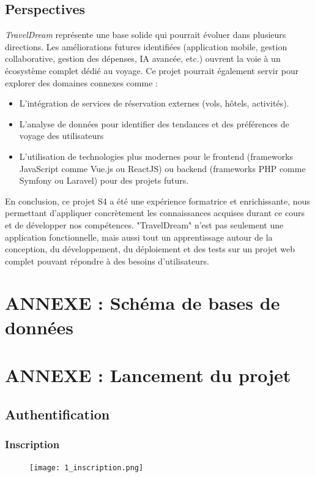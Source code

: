 \documentclass[a4paper,12pt]{article}
\begin{document}
\subsection{Perspectives}
\textit{TravelDream}  représente une base solide qui pourrait évoluer dans plusieurs directions. Les améliorations futures identifiées (application mobile, gestion collaborative, gestion des dépenses, IA avancée, etc.) ouvrent la voie à un écosystème complet dédié au voyage.
Ce projet pourrait également servir pour explorer des domaines connexes
comme :
\begin{itemize}
    \item L'intégration de services de réservation externes (vols, hôtels, activités).
    \item L'analyse de données pour identifier des tendances et des préférences de voyage des utilisateurs
    \item L'utilisation de technologies plus modernes pour le frontend (frameworks JavaScript comme Vue.js ou ReactJS) ou backend (frameworks PHP comme Symfony ou Laravel) pour des projets futurs.
\end{itemize}
En conclusion, ce projet S4 a été une expérience
formatrice et enrichissante, nous permettant d'appliquer concrètement les
connaissances acquises durant ce cours et de développer nos compétences. "TravelDream" n'est pas seulement une
application fonctionnelle, mais aussi tout un apprentissage autour de la conception, du développement, du déploiement et des tests sur un projet web complet pouvant répondre à des besoins d'utilisateurs.

\newpage 
\section{ANNEXE : Schéma de bases de données}

\newpage 
\section{ANNEXE : Lancement du projet}

\subsection{Authentification}

\subsubsection{Inscription}
\begin{figure}[H]
    \centering
    \texttt{[image: 1\_inscription.png]}
\end{figure}
\end{document}
